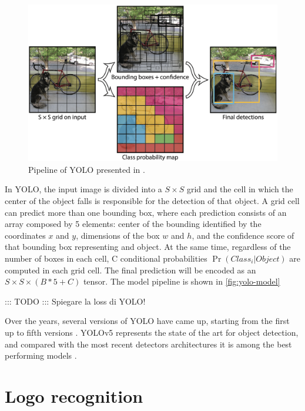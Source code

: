 \begin{figure}
    \begin{center}
        \includegraphics[width=\columnwidth]{images/yolo-model.png}
    \end{center}
    \caption{Pipeline of YOLO presented in \cite{redmon2016you}.}
    \label{fig:yolo-model}
\end{figure}

In YOLO, the input image is divided into a $S \times S$ grid and the cell in which the center of the object falls is responsible for the detection of that object.
A grid cell can predict more than one bounding box, where each prediction consists of an array composed by 5 elements: center of the bounding identified by the coordinates $x$ and $y$, dimensions of the box $w$ and $h$, and the confidence score of that bounding box representing and object. At the same time, regardless of the number of boxes in each cell, C conditional probabilities $\Pr(Class_i | Object)$ are computed in each grid cell. The final prediction will be encoded as an $S \times S \times (B * 5 + C)$ tensor. The model pipeline is shown in \autoref{fig:yolo-model}


\vspace{1.5\baselineskip}
::: TODO ::: Spiegare la loss di YOLO!


Over the years, several versions of YOLO have came up, starting from the first up to fifth versions \cite{redmon2016you, redmon2017yolo9000, redmon2018yolov3, bochkovskiy2020yolov4, glenn_jocher_2021_5563715}. YOLOv5 represents the state of the art for object detection, and compared with the most recent detectors architectures it is among the best performing models \cite{zaidi2022survey}.

\section{Logo recognition}
\label{sec:sota-logoyolo}


